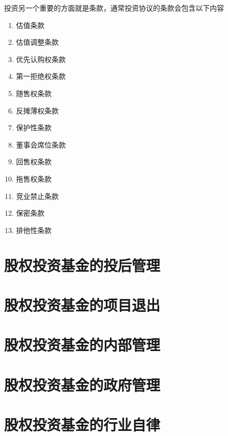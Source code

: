 \documentclass[UTF8,12pt]{ctexbook}
\numberwithin{equation}{section} %
\numberwithin{figure}{section}
\numberwithin{table}{section}
\begin{document}
	投资另一个重要的方面就是条款，通常投资协议的条款会包含以下内容
	\begin{enumerate}
		\item 估值条款
		
		\item 估值调整条款
		
		\item 优先认购权条款
		
		\item 第一拒绝权条款
		
		\item 随售权条款
		
		\item 反摊薄权条款
		
		\item 保护性条款
		
		\item 董事会席位条款
		
		\item 回售权条款
		
		\item 拖售权条款
		
		\item 竞业禁止条款
		
		\item 保密条款
		
		\item 排他性条款
	\end{enumerate}
	
	\section{股权投资基金的投后管理}
	
	\section{股权投资基金的项目退出}
	
	\section{股权投资基金的内部管理}
	
	\section{股权投资基金的政府管理}
	
	\section{股权投资基金的行业自律}
	
	
	
	
\end{document}
